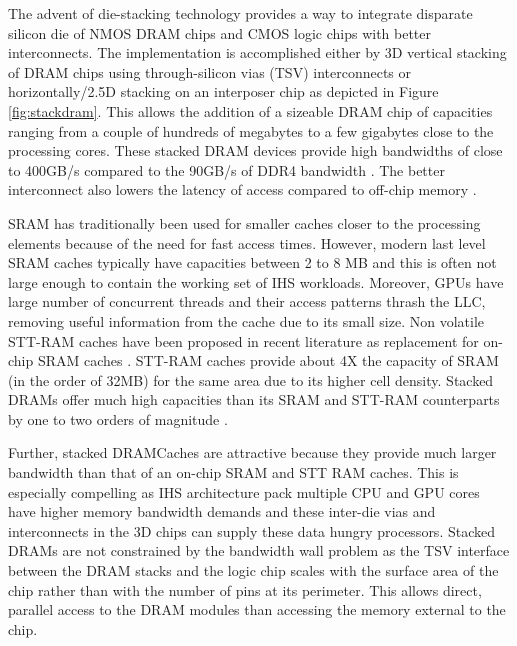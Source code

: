 \par The advent of die-stacking technology \cite{3d-stacking} provides a way to integrate disparate silicon die of NMOS DRAM chips and CMOS logic chips with better interconnects. The implementation is accomplished either by 3D vertical stacking of DRAM chips using through-silicon vias (TSV) interconnects or horizontally/2.5D stacking on an interposer chip as depicted in Figure \ref{fig:stackdram}. This allows the addition of a sizeable DRAM chip of capacities ranging from a couple of hundreds of megabytes to a few gigabytes close to the processing cores. These stacked DRAM devices provide high bandwidths of close to 400GB/s compared to the 90GB/s of DDR4 bandwidth \cite{xeonphi}. The better interconnect also lowers the latency of access compared to off-chip memory \cite{alloy}. 
\par SRAM has traditionally been used for smaller caches closer to the processing elements because of the need for fast access times.
However, modern last level SRAM caches typically have capacities between 2 to 8 MB \cite{skylake} and this is often not large enough to contain the working set of IHS workloads.
Moreover, GPUs have large number of concurrent threads and their access patterns thrash the LLC, removing useful information from the cache due to its small size. 
Non volatile STT-RAM caches have been proposed in recent literature as replacement for on-chip SRAM caches \cite{oscar}. STT-RAM caches provide about 4X the capacity of SRAM \cite{oscar} (in the order of 32MB) for the same area due to its higher cell density.
Stacked DRAMs offer much high capacities than its SRAM and STT-RAM counterparts by one to two orders of magnitude \cite{3d-stacked}.
\par Further, stacked DRAMCaches are attractive because they provide much larger bandwidth than that of an on-chip SRAM and STT RAM caches.
This is especially compelling as IHS architecture pack multiple CPU and GPU cores have higher memory bandwidth demands and these inter-die vias and interconnects in the 3D chips can supply these data hungry processors.
Stacked DRAMs are not constrained by the bandwidth wall problem as the TSV interface between the DRAM stacks and the logic chip scales with the surface area of the chip rather than with the number of pins at its perimeter. This allows direct, parallel access to the DRAM modules than accessing the memory external to the chip.
